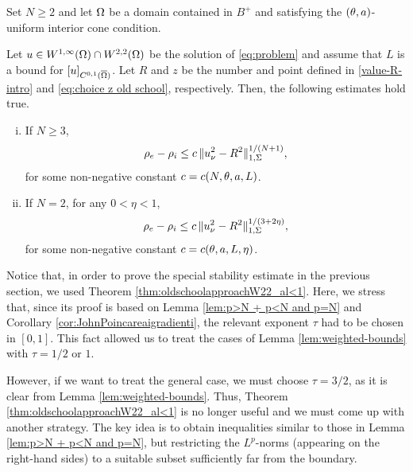\documentclass[a4paper,10pt]{amsart}
\numberwithin{equation}{section}
\begin{document}
\begin{thm}
\label{thm:stability-general}
Set $N\ge 2$ and let $\Omega$ be a domain contained in $B^+$ and satisfying
the $(\theta,a)$-uniform interior cone condition. 
\par
Let $u\in W^{1,\infty}(\Omega)\cap W^{2,2} (\Omega)$ be the solution of \eqref{eq:problem} and assume that $L$ is a bound for $[u]_{C^{0,1}(\overline{\Omega})}$.
Let $R$ and $z$ be the number and point defined in \eqref{value-R-intro} and \eqref{eq:choice z old school}, respectively. 
Then, the following estimates hold true.
\begin{enumerate}[(i)]	
\item
If $N \ge 3$, 
\begin{equation*}
\rho_e-\rho_i\le c \, \Vert u_\nu^2 - R^2 \Vert_{1,\Sigma}^{1/(N+1)},
\end{equation*}
for some non-negative constant $c= c(N,\theta, a, L)$.
\item
If $N = 2$, for any $0<\eta<1$, 
	\begin{equation*}
		\rho_e-\rho_i\le c \, \Vert u_\nu^2 - R^2 \Vert_{1,\Sigma}^{1/(3 + 2\eta)}  ,
	\end{equation*}
for some non-negative constant $c= c(\theta, a, L, \eta )$.
\end{enumerate}
\end{thm}

Notice that, in order to prove the special stability estimate in the previous section, we used Theorem  \ref{thm:oldschoolapproachW22_al<1}. Here, we stress that, since its proof is based on
Lemma \ref{lem:p>N + p<N and p=N} and Corollary \ref{cor:JohnPoincareaigradienti}, the relevant exponent $\tau$ had to be chosen in $[0,1]$. 
This fact allowed us to treat the cases of Lemma \ref{lem:weighted-bounds} with $\tau=1/2$ or $1$.
\par
However, if we want to treat the general case, we must choose $\tau=3/2$, as it is clear from Lemma \ref{lem:weighted-bounds}.  Thus, Theorem  \ref{thm:oldschoolapproachW22_al<1} is no longer useful and we must come up with another strategy.
The key idea is to obtain inequalities similar to those in Lemma \ref{lem:p>N + p<N and p=N}, but restricting the $L^p$-norms (appearing on the right-hand sides) to a suitable subset sufficiently far from the boundary. 
%
%
\end{document}
